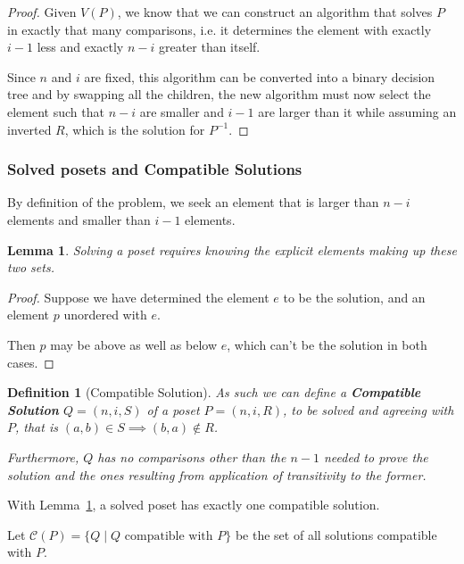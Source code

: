 \documentclass[10pt,journal,compsoc]{IEEEtran}
\newtheorem{lemma}{Lemma}
\newtheorem{definition}{Definition}
\begin{document}
\begin{proof}
  Given $V(P)$, we know that we can construct an algorithm that solves $P$ in exactly that many comparisons, i.e. it determines the element with exactly $i - 1$ less and exactly $n - i$ greater than itself.

  Since $n$ and $i$ are fixed, this algorithm can be converted into a binary decision tree and by swapping all the children, the new algorithm must now select the element such that $n - i$ are smaller and $i - 1$ are larger than it while assuming an inverted $R$, which is the solution for $P^{-1}$.
\end{proof}


\subsubsection{Solved posets and Compatible Solutions}
By definition of the problem, we seek an element that is larger than $n-i$ elements and smaller than $i - 1$ elements.

\begin{lemma}\label{lemma:partition}
  Solving a poset requires knowing the explicit elements making up these two sets.
\end{lemma}

\begin{proof}
  Suppose we have determined the element $e$ to be the solution, and an element $p$ unordered with $e$.

  Then $p$ may be above as well as below $e$, which can't be the solution in both cases.
\end{proof}

\begin{definition}[Compatible Solution]
  As such we can define a \textbf{Compatible Solution} $Q = (n, i, S)$ of a poset $P = (n, i, R)$, to be solved and agreeing with $P$, that is $(a, b)\in S\implies (b, a)\notin R$.

  Furthermore, $Q$ has no comparisons other than the $n - 1$ needed to prove the solution and the ones resulting from application of transitivity to the former.
\end{definition}

With Lemma~\ref{lemma:partition}, a solved poset has exactly one compatible solution.

Let $\mathcal{C}(P) = \{Q \mid Q \text{ compatible with } P\}$ be the set of all solutions compatible with $P$.
\end{document}
